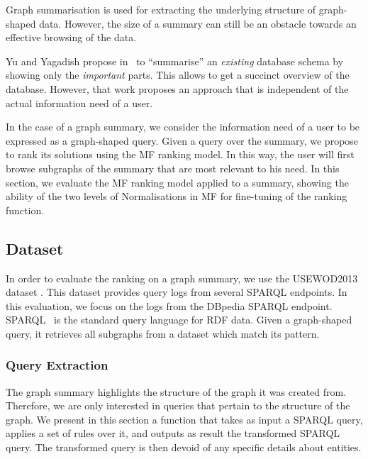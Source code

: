 Graph summarisation is used for extracting the underlying structure of graph-shaped data. However, the size of a summary can still be an obstacle towards an effective browsing of the data.

Yu and Yagadish propose in~\cite{yu:2006:schema-summarization} to ``summarise'' an \emph{existing} database schema by showing only the \emph{important} parts. This allows to get a succinct overview of the database.
However, that work proposes an approach that is independent of the actual information need of a user.

In the case of a graph summary, we consider the information need of a user to be expressed as a graph-shaped query. Given a query over the summary, we propose to rank its solutions using the \gls{MF} ranking model. In this way, the user will first browse subgraphs of the summary that are most relevant to his need. In this section, we evaluate the \gls{MF} ranking model applied to a summary, showing the ability of the two levels of Normalisations in \gls{MF} for fine-tuning of the ranking function.

\subsection{Dataset}
\label{sec:summary-ranking:dataset}

In order to evaluate the ranking on a graph summary, we use the USEWOD2013 dataset \cite{usewod:2013}. This dataset provides query logs from several SPARQL endpoints. In this evaluation, we focus on the logs from the DBpedia SPARQL endpoint. SPARQL~\cite{PrudS08} is the standard query language for RDF data. Given a graph-shaped query, it retrieves all subgraphs from a dataset which match its pattern.

\subsubsection{Query Extraction}

The graph summary highlights the structure of the graph it was created from. Therefore, we are only interested in queries that pertain to the structure of the graph. We present in this section a function that takes as input a SPARQL query, applies a set of rules over it, and outputs as result the transformed SPARQL query. The transformed query is then devoid of any specific details about entities.

